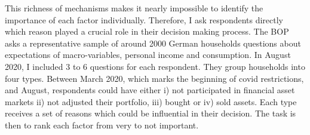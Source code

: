 \documentclass[ProjectABM]{subfiles}
\begin{document}











This richness of mechanisms makes it nearly impossible to identify the importance of each factor individually. Therefore, I ask respondents directly which reason played a crucial role in their decision making process. The BOP asks a representative sample of around 2000 German households questions about expectations of macro-variables, personal income and consumption. In August 2020, I included 3 to 6 questions for each respondent. They group households into four types. Between March 2020, which marks the beginning of covid restrictions, and August, respondents could have either i) not participated in financial asset markets ii) not adjusted their portfolio, iii) bought or iv) sold assets. Each type receives a set of reasons which could be influential in their decision. The task is then to rank each factor from very to not important.
\end{document}

